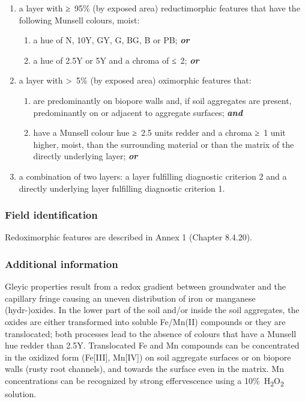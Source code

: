 \documentclass[
  letterpaper,
  DIV=11,
  numbers=noendperiod]{scrreprt}
\providecommand{\tightlist}{%
  \setlength{\itemsep}{0pt}\setlength{\parskip}{0pt}}\usepackage{longtable,booktabs,array}
\begin{document}
\begin{enumerate}
\def\labelenumi{\arabic{enumi}.}
\item
  a layer with ≥~95\% (by exposed area) reductimorphic features that
  have the following Munsell colours, moist:

  \begin{enumerate}
  \def\labelenumii{\alph{enumii}.}
  \tightlist
  \item
    a hue of N, 10Y, GY, G, BG, B or PB; \textbf{\emph{or}}
  \item
    a hue of 2.5Y or 5Y and a chroma of ≤~2; \textbf{\emph{or}}
  \end{enumerate}
\item
  a layer with \textgreater~5\% (by exposed area) oximorphic features
  that:

  \begin{enumerate}
  \def\labelenumii{\alph{enumii}.}
  \tightlist
  \item
    are predominantly on biopore walls and, if soil aggregates are
    present, predominantly on or adjacent to aggregate surfaces;
    \textbf{\emph{and}}
  \item
    have a Munsell colour hue ≥~2.5 units redder and a chroma ≥~1 unit
    higher, moist, than the surrounding material or than the matrix of
    the directly underlying layer; \textbf{\emph{or}}
  \end{enumerate}
\item
  a combination of two layers: a layer fulfilling diagnostic criterion 2
  and a directly underlying layer fulfilling diagnostic criterion 1.
\end{enumerate}

\hypertarget{field-identification-34}{%
\subsubsection{Field identification}\label{field-identification-34}}

Redoximorphic features are described in Annex 1 (Chapter 8.4.20).

\hypertarget{additional-information-25}{%
\subsubsection{Additional information}\label{additional-information-25}}

Gleyic properties result from a redox gradient between groundwater and
the capillary fringe causing an uneven distribution of iron or manganese
(hydr-)oxides. In the lower part of the soil and/or inside the soil
aggregates, the oxides are either transformed into soluble Fe/Mn(II)
compounds or they are translocated; both processes lead to the absence
of colours that have a Munsell hue redder than 2.5Y. Translocated Fe and
Mn compounds can be concentrated in the oxidized form (Fe{[}III{]},
Mn{[}IV{]}) on soil aggregate surfaces or on biopore walls (rusty root
channels), and towards the surface even in the matrix. Mn concentrations
can be recognized by strong effervescence using a
10\%~H\textsubscript{2}O\textsubscript{2} solution.
\end{document}
